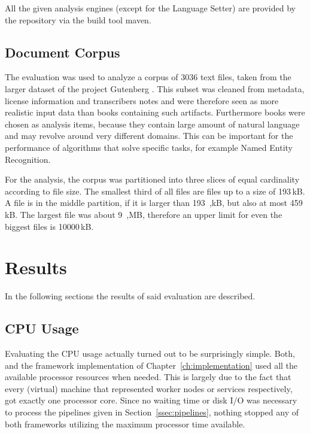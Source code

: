 \begin{itemize}
\begin{enumerate}
	\end{enumerate}
	
\end{itemize}
All the given analysis engines (except for the Language Setter) are provided by the \dkpro{} repository via the build tool maven. 

\subsection{Document Corpus}
The evaluation was used to analyze a corpus of 3036 text files, taken from the larger dataset of the project Gutenberg \cite{lahiri:2014:SRW}. This subset was cleaned from metadata, license information and transcribers notes and were therefore seen as more realistic input data than books containing such artifacts. Furthermore books were chosen as analysis items, because they contain large amount of natural language and may revolve around very different domains. This can be important for the performance of algorithms that solve specific \nlp{} tasks, for example Named Entity Recognition. 

For the analysis, the corpus was partitioned into three slices of equal cardinality according to file size. The smallest third of all files are files up to a size of 193\,kB. A file is in the middle partition, if it is larger than 193~,kB, but also at most 459\,kB. The largest file was about 9~,MB, therefore an upper limit for even the biggest files is 10000\,kB.
\section{Results}

In the following sections the results of said evaluation are described.

\subsection{CPU Usage}
Evaluating the CPU usage actually turned out to be surprisingly simple. Both, \uimaas{} and the framework implementation of Chapter~\ref{ch:implementation} used all the available processor resources when needed. This is largely due to the fact that every (virtual) machine that represented worker nodes or services respectively, got exactly one processor core. Since no waiting time or disk I/O was necessary to process the pipelines given in Section~\ref{ssec:pipelines}, nothing stopped any of both frameworks utilizing the maximum processor time available.

